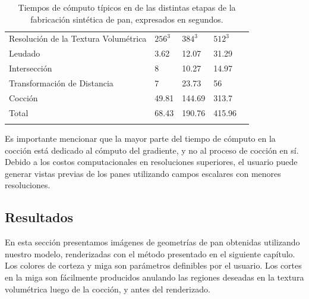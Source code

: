\begin{table}[h!]
\begin{tabular}{lllll}
\hline\noalign{\smallskip}
Resolución de la Textura Volumétrica & $256^{3}$ & $384^{3}$  & $512^{3}$ \\
\noalign{\smallskip}\hline\noalign{\smallskip}
Leudado & 3.62 & 12.07 & 31.29 \\
Intersección & 8 & 10.27 & 14.97 \\
Transformación de Distancia & 7 & 23.73 & 56 \\
Cocción  & 49.81 & 144.69 & 313.7 \\
\hline\noalign{\smallskip}
Total & 68.43 & 190.76 & 415.96 \\
\noalign{\smallskip}\hline
\end{tabular}
\caption{Tiempos de cómputo típicos en de las distintas etapas de la fabricación sintética de pan, expresados en segundos.}
\label{tab:computingtimes}
\end{table}

Es importante mencionar que la mayor parte del tiempo de cómputo en la cocción está dedicado al cómputo del gradiente, y no al proceso de cocción en sí.
Debido a los costos computacionales en resoluciones superiores, el usuario puede generar vistas previas de los panes utilizando campos escalares con menores resoluciones.


\subsection{Resultados}

En esta sección presentamos imágenes de geometrías de pan obtenidas utilizando nuestro modelo, renderizadas con el método presentado en el siguiente capítulo.
Los colores de corteza y miga son parámetros definibles por el usuario. Los cortes en la miga son fácilmente producidos anulando las regiones deseadas en la textura volumétrica luego de la cocción, y antes del renderizado.

